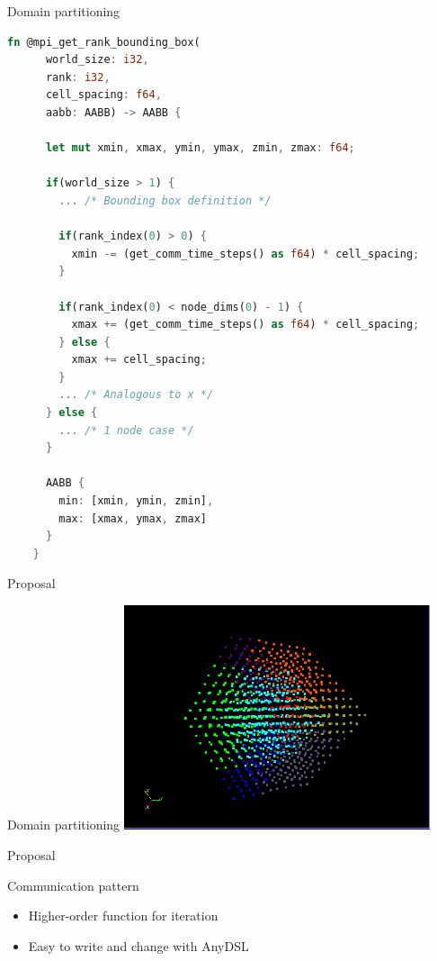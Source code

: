 \documentclass[aspectratio=43,t]{beamer}
\begin{document}
  \begin{frame}[fragile]{Domain partitioning}
    \begin{lstlisting}[basicstyle=\tiny\ttfamily,language=Rust]
    fn @mpi_get_rank_bounding_box(
      world_size: i32,
      rank: i32,
      cell_spacing: f64,
      aabb: AABB) -> AABB {

      let mut xmin, xmax, ymin, ymax, zmin, zmax: f64;

      if(world_size > 1) {
        ... /* Bounding box definition */

        if(rank_index(0) > 0) {
          xmin -= (get_comm_time_steps() as f64) * cell_spacing;
        }

        if(rank_index(0) < node_dims(0) - 1) {
          xmax += (get_comm_time_steps() as f64) * cell_spacing;
        } else {
          xmax += cell_spacing;
        }
        ... /* Analogous to x */
      } else {
        ... /* 1 node case */
      }

      AABB {
        min: [xmin, ymin, zmin],
        max: [xmax, ymax, zmax]
      }
    }
    \end{lstlisting}
  \end{frame}

  \begin{frame}{Proposal}
    \begin{block}{Domain partitioning}
      \includegraphics[width=9cm]{domain_partitioning.png}
    \end{block}
  \end{frame}

  \begin{frame}{Proposal}
    \begin{block}{Communication pattern}
      \begin{itemize}
        \item Higher-order function for iteration
        \item Easy to write and change with AnyDSL
      \end{itemize}
    \end{block}
  \end{frame}
\end{document}
